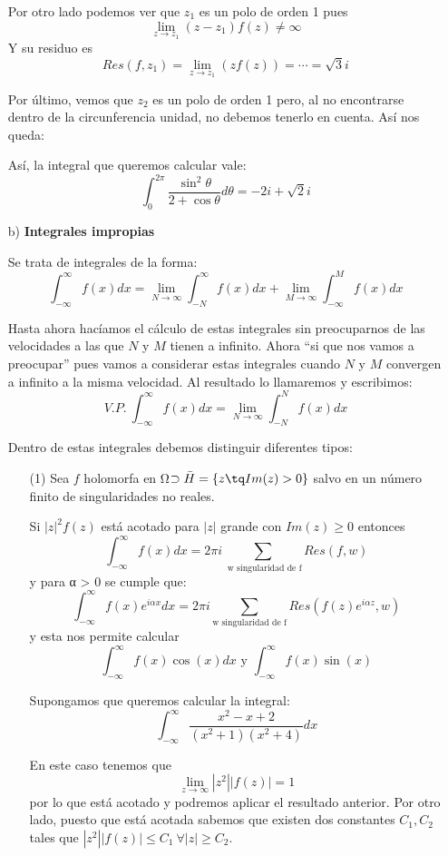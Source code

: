 \documentclass{apuntes}
\begin{document}
\begin{enumerate}
\begin{example}
Por otro lado podemos ver que $z_1$ es un polo de orden 1 pues
\[\lim_{z \to z_1} (z-z_1)f(z) \neq \infty\]
Y su residuo es
\[Res(f,z_1) = \lim_{z \to z_1}\left(zf(z)\right) = \dotsb = \sqrt{3}i\]

Por último, vemos que $z_2$ es un polo de orden 1 pero, al no encontrarse dentro de la circunferencia unidad, no debemos tenerlo en cuenta. Así nos queda:

Así, la integral que queremos calcular vale:
\[\int_0^{2π} \frac{\sin^2 \theta}{2+\cos \theta}d\theta = -2i + \sqrt{2}i\]
\end{example}

\item[b)] \textbf{Integrales impropias}

Se trata de integrales de la forma:
\[\int_{-\infty}^{\infty} f(x)dx = \lim_{N \to \infty}\int_{-N}^{\infty}f(x)dx + \lim_{M \to \infty} \int_{-\infty}^{M} f(x)dx\]

Hasta ahora hacíamos el cálculo de estas integrales sin preocuparnos de las velocidades a las que $N$ y $M$ tienen a infinito. Ahora ``si que nos vamos a preocupar'' pues vamos a considerar estas integrales cuando $N$ y $M$ convergen a infinito a la misma velocidad. Al resultado lo llamaremos  y escribimos:
\[V.P. \ \int_{-\infty}^{\infty} f(x)dx = \lim_{N \to \infty}\int_{-N}^N f(x)dx\]

Dentro de estas integrales debemos distinguir diferentes tipos:
\begin{enumerate}
\item[(1)] Sea $f$ holomorfa en Ω$\supset \bar{H}=\{z \tq Im(z)>0\}$ salvo en un número finito de singularidades no reales.

Si $|z|^2f(z)$ está acotado para $|z|$ grande con $Im(z)\geq 0$ entonces
\[\int_{-\infty}^{\infty}f(x)dx = 2πi \sum_{\text{ w singularidad de f}}Res(f,w)\]
y para α > 0 se cumple que:
\[\int_{-\infty}^{\infty} f(x)e^{iαx}dx = 2πi \sum_{\text{w singularidad de f}}Res(f(z)e^{iαz},w)\]
y esta nos permite calcular
\[\int_{-\infty}^{\infty} f(x)\cos(x)dx \text{ y } \int_{-\infty}^{\infty}f(x)\sin(x)\]

\begin{example}
Supongamos que queremos calcular la integral:
\[\int_{-\infty}^{\infty} \frac{x^2-x+2}{(x^2+1)(x^2+4)}dx\]

En este caso tenemos que
\[\lim_{z \to \infty} |z^2||f(z)|=1\]
por lo que está acotado y podremos aplicar el resultado anterior. Por otro lado, puesto que está acotada sabemos que existen dos constantes $C_1, C_2$ tales que $|z^2||f(z)|\leq C_1 \ \forall |z|  \geq C_2$.


\end{example}
\end{enumerate}
\end{enumerate}
\end{document}
